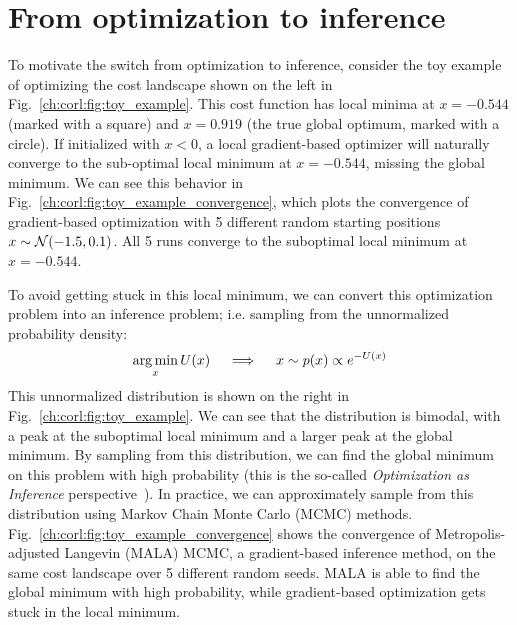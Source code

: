 \section{From optimization to inference}

To motivate the switch from optimization to inference, consider the toy example of optimizing the cost landscape shown on the left in Fig.~\ref{ch:corl:fig:toy_example}. This cost function has local minima at $x = -0.544$ (marked with a square) and $x = 0.919$ (the true global optimum, marked with a circle). If initialized with $x < 0$, a local gradient-based optimizer will naturally converge to the sub-optimal local minimum at $x = -0.544$, missing the global minimum. We can see this behavior in Fig.~\ref{ch:corl:fig:toy_example_convergence}, which plots the convergence of gradient-based optimization with 5 different random starting positions $x\sim\mathcal{N}(-1.5, 0.1)$. All 5 runs converge to the suboptimal local minimum at $x = -0.544$.

To avoid getting stuck in this local minimum, we can convert this optimization problem into an inference problem; i.e. sampling from the unnormalized probability density:
\begin{align*}
    \operatorname*{arg\,min}_x U(x) \quad \implies \quad x \sim p(x) \propto e^{-U(x)}
\end{align*}
%
This unnormalized distribution is shown on the right in Fig.~\ref{ch:corl:fig:toy_example}. We can see that the distribution is bimodal, with a peak at the suboptimal local minimum and a larger peak at the global minimum. By sampling from this distribution, we can find the global minimum on this problem with high probability (this is the so-called \textit{Optimization as Inference} perspective~\cite{maSamplingCanBe2019,levineReinforcementLearningControl2018a}). In practice, we can approximately sample from this distribution using Markov Chain Monte Carlo (MCMC) methods. 
%
Fig.~\ref{ch:corl:fig:toy_example_convergence} shows the convergence of Metropolis-adjusted Langevin (MALA) MCMC, a gradient-based inference method, on the same cost landscape over 5 different random seeds. MALA is able to find the global minimum with high probability, while gradient-based optimization gets stuck in the local minimum.

